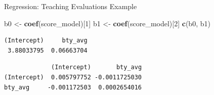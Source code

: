 \documentclass[
  ignorenonframetext,
]{beamer}
\newenvironment{Shaded}{\begin{snugshade}}{\end{snugshade}}
\newcommand{\DecValTok}[1]{\textcolor[rgb]{0.00,0.00,0.81}{#1}}
\newcommand{\FunctionTok}[1]{\textcolor[rgb]{0.13,0.29,0.53}{\textbf{#1}}}
\newcommand{\NormalTok}[1]{#1}
\newcommand{\OtherTok}[1]{\textcolor[rgb]{0.56,0.35,0.01}{#1}}
\newcommand{\SpecialCharTok}[1]{\textcolor[rgb]{0.81,0.36,0.00}{\textbf{#1}}}
\begin{document}
\begin{frame}[fragile]{Regression: Teaching Evaluations Example}
\protect{}\label{regression-teaching-evaluations-example-10}
\normalsize

\begin{Shaded}
\begin{Highlighting}[]
\NormalTok{b0 }\OtherTok{\textless{}{-}} \FunctionTok{coef}\NormalTok{(score\_model)[}\DecValTok{1}\NormalTok{]}
\NormalTok{b1 }\OtherTok{\textless{}{-}} \FunctionTok{coef}\NormalTok{(score\_model)[}\DecValTok{2}\NormalTok{]}
\FunctionTok{c}\NormalTok{(b0, b1)}
\end{Highlighting}
\end{Shaded}

\begin{verbatim}
(Intercept)     bty_avg 
 3.88033795  0.06663704 
\end{verbatim}

\begin{Shaded}
\end{Shaded}

\begin{verbatim}
             (Intercept)       bty_avg
(Intercept)  0.005797752 -0.0011725030
bty_avg     -0.001172503  0.0002654016
\end{verbatim}

\normalsize
\end{frame}
\end{document}
